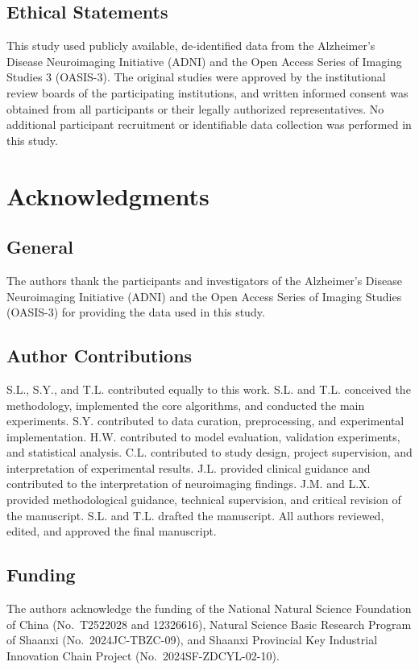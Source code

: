\documentclass{article}
\begin{document}
\subsection{Ethical Statements}

This study used publicly available, de-identified data from the Alzheimer's Disease Neuroimaging Initiative (ADNI) and the Open Access Series of Imaging Studies 3 (OASIS-3). The original studies were approved by the institutional review boards of the participating institutions, and written informed consent was obtained from all participants or their legally authorized representatives. No additional participant recruitment or identifiable data collection was performed in this study.



\section*{Acknowledgments}

\subsection*{General}

The authors thank the participants and investigators of the Alzheimer's Disease Neuroimaging Initiative (ADNI) and the Open Access Series of Imaging Studies (OASIS-3) for providing the data used in this study.

\subsection*{Author Contributions}

S.L., S.Y., and T.L. contributed equally to this work. S.L. and T.L. conceived
the methodology, implemented the core algorithms, and conducted the main
experiments. S.Y. contributed to data curation, preprocessing, and experimental
implementation. H.W. contributed to model evaluation, validation experiments,
and statistical analysis. C.L. contributed to study design, project supervision,
and interpretation of experimental results. J.L. provided clinical guidance and
contributed to the interpretation of neuroimaging findings. J.M. and L.X.
provided methodological guidance, technical supervision, and critical revision
of the manuscript. S.L. and T.L. drafted the manuscript. All authors reviewed,
edited, and approved the final manuscript.

\subsection*{Funding}
The authors acknowledge the funding of the National Natural Science Foundation of China (No.~T2522028 and 12326616), Natural Science Basic Research Program of Shaanxi (No.~2024JC-TBZC-09), and Shaanxi Provincial Key Industrial Innovation Chain Project (No.~2024SF-ZDCYL-02-10).
\end{document}
